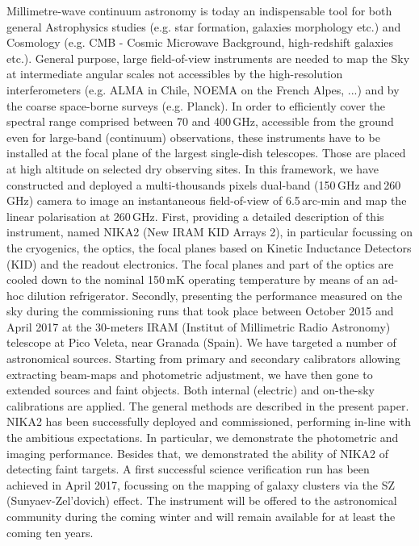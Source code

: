 \documentclass[]{aa} %
\begin{document}
  \abstract
   {Millimetre-wave continuum astronomy is today an indispensable tool for both general Astrophysics studies (e.g. star formation, galaxies morphology etc.) and Cosmology (e.g. CMB - Cosmic Microwave Background, high-redshift galaxies etc.). General purpose, large field-of-view instruments are needed to map the Sky at intermediate angular scales not accessibles by the high-resolution interferometers (e.g. ALMA in Chile, NOEMA on the French Alpes, ...) and by the coarse space-borne surveys (e.g. Planck). In order to efficiently cover the spectral range comprised between 70 and 400\,GHz, accessible from the ground even for large-band (continuum) observations, these instruments have to be installed at the focal plane of the largest single-dish telescopes. Those are placed at high altitude on selected dry observing sites. In this framework, we have constructed and deployed a multi-thousands pixels dual-band (150\,GHz and\,260 GHz) camera to image an instantaneous field-of-view of 6.5\,arc-min and map the linear polarisation at 260\,GHz.}
   {First, providing a detailed description of this instrument, named NIKA2 (New IRAM KID Arrays 2), in particular focussing on the cryogenics, the optics, the focal planes based on Kinetic Inductance Detectors (KID) and the readout electronics. The focal planes and part of the optics are cooled down to the nominal 150\,mK operating temperature by means of an ad-hoc dilution refrigerator. 
Secondly, presenting the performance measured on the sky during the commissioning runs that took place between October 2015 and April 2017 at the 30-meters IRAM (Institut of Millimetric Radio Astronomy) telescope at Pico Veleta, near Granada (Spain).}
   {We have targeted a number of astronomical sources. Starting from primary and secondary calibrators allowing extracting beam-maps and photometric adjustment, we have then gone to extended sources and faint objects. Both internal (electric) and on-the-sky calibrations are applied. The general methods are described in the present paper.}
   {NIKA2 has been successfully deployed and commissioned, performing in-line with the ambitious expectations. In particular, we demonstrate the photometric and imaging performance. Besides that, we demonstrated the ability of NIKA2 of detecting faint targets. A first successful science verification run has been achieved in April 2017, focussing on the mapping of galaxy clusters via the SZ (Sunyaev-Zel\textquoteright dovich) effect. The instrument will be offered to the astronomical community during the coming winter and will remain available for at least the coming ten years.}
  {}
\end{document}

